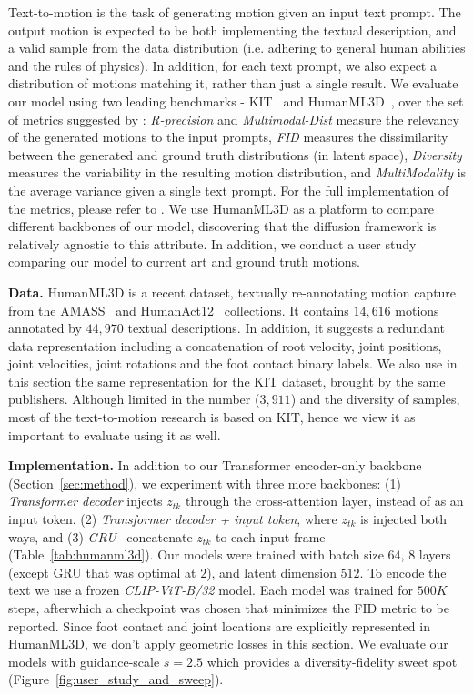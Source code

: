 Text-to-motion is the task of generating motion given an input text prompt. The output motion is expected to be both implementing the textual description, and a valid sample from the data distribution (i.e. adhering to general human abilities and the rules of physics). In addition, for each text prompt, we also expect a distribution of motions matching it, rather than just a single result. We evaluate our model using two leading benchmarks - KIT~\citep{plappert2016kit} and HumanML3D~\citep{guo2022generating}, over the set of metrics suggested by \citet{guo2022generating}: 
 \textit{R-precision} and \textit{Multimodal-Dist} measure the relevancy of the generated motions to the input prompts, \textit{FID} measures the dissimilarity between the generated and ground truth distributions (in latent space), \textit{Diversity} measures the variability in the resulting motion distribution, and \textit{MultiModality} is the average variance given a single text prompt. For the full implementation of the metrics, please refer to \citet{guo2022generating}.
We use HumanML3D as a platform to compare different backbones of our model, discovering that the diffusion framework is relatively agnostic to this attribute.
In addition, we conduct a user study comparing our model to current art and ground truth motions. 

\textbf{Data.}
HumanML3D is a recent dataset, textually re-annotating motion capture from the AMASS~\citep{AMASS:ICCV:2019} and HumanAct12~\citep{guo2020action2motion} collections. 
It contains $14,616$ motions annotated by $44,970$ textual descriptions.
In addition, it suggests a redundant data representation including a concatenation of root velocity, joint positions, joint velocities, joint rotations and the foot contact binary labels. We also use in this section the same representation for the KIT dataset, brought by the same publishers. 
Although limited in the number ($3,911$) and the diversity of samples, most of the text-to-motion research is based on KIT, hence we view it as important to evaluate using it as well. 

\textbf{Implementation.}
In addition to our Transformer encoder-only backbone (Section~\ref{sec:method}), we experiment \ourmethod{} with three more backbones: (1) \textit{Transformer decoder} injects $z_{tk}$ through the cross-attention layer, instead of as an input token. (2) \textit{Transformer decoder + input token}, where $z_{tk}$ is injected both ways, and (3) \textit{GRU}~\citep{cho2014learning} concatenate $z_{tk}$ to each input frame (Table~\ref{tab:humanml3d}). 
Our models were trained with batch size $64$, $8$ layers (except GRU that was optimal at $2$), and latent dimension $512$. To encode the text we use a frozen \textit{CLIP-ViT-B/32} model.
Each model was trained for $500K$ steps, afterwhich a checkpoint was chosen that minimizes the FID metric to be reported. Since foot contact and joint locations are explicitly represented in HumanML3D, we don't apply geometric losses in this section. We evaluate our models with guidance-scale $s=2.5$ which provides a diversity-fidelity sweet spot (Figure~\ref{fig:user_study_and_sweep}).


